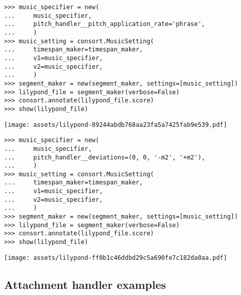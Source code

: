 \begin{singlespacing}
\vspace{-0.5\baselineskip}
\begin{lstlisting}
>>> music_specifier = new(
...     music_specifier,
...     pitch_handler__pitch_application_rate='phrase',
...     )
>>> music_setting = consort.MusicSetting(
...     timespan_maker=timespan_maker,
...     v1=music_specifier,
...     v2=music_specifier,
...     )
>>> segment_maker = new(segment_maker, settings=[music_setting])
>>> lilypond_file = segment_maker(verbose=False)
>>> consort.annotate(lilypond_file.score)
>>> show(lilypond_file)
\end{lstlisting}
\noindent\texttt{[image: assets/lilypond-89244abdb768aa23fa5a7425fab9e539.pdf]}
\end{singlespacing}

\begin{comment}
<abjad>[stylesheet=../consort.ily]
music_specifier = new(
    music_specifier,
    pitch_handler__deviations=(0, 0, '-m2', '+m2'),
    )
music_setting = consort.MusicSetting(
    timespan_maker=timespan_maker,
    v1=music_specifier,
    v2=music_specifier,
    )
segment_maker = new(segment_maker, settings=[music_setting])
lilypond_file = segment_maker(verbose=False)
consort.annotate(lilypond_file.score)
show(lilypond_file)
</abjad>
\end{comment}

\begin{singlespacing}
\vspace{-0.5\baselineskip}
\begin{lstlisting}
>>> music_specifier = new(
...     music_specifier,
...     pitch_handler__deviations=(0, 0, '-m2', '+m2'),
...     )
>>> music_setting = consort.MusicSetting(
...     timespan_maker=timespan_maker,
...     v1=music_specifier,
...     v2=music_specifier,
...     )
>>> segment_maker = new(segment_maker, settings=[music_setting])
>>> lilypond_file = segment_maker(verbose=False)
>>> consort.annotate(lilypond_file.score)
>>> show(lilypond_file)
\end{lstlisting}
\noindent\texttt{[image: assets/lilypond-ff0b1c46ddbd29c5a690fe7c182da0aa.pdf]}
\end{singlespacing}

\subsection{Attachment handler examples}


